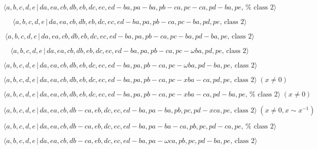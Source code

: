 \documentclass[10pt]{article}
\begin{document}
\begin{equation}
\langle
a,b,c,d,e\,|\,da,ea,cb,db,eb,dc,ec,ed-ba,pa-ba,pb-ca,pc-ca,pd-ba,pe,\,\text{%
class }2\rangle  \tag{7.4696}
\end{equation}

\begin{equation}
\langle a,b,c,d,e\,|\,da,ea,cb,db,eb,dc,ec,ed-ba,pa,pb-ca,pc-ba,pd,pe,\,%
\text{class }2\rangle  \tag{7.4697}
\end{equation}

\begin{equation}
\langle a,b,c,d,e\,|\,da,ea,cb,db,eb,dc,ec,ed-ba,pa,pb-ca,pc-ba,pd-ba,pe,\,%
\text{class }2\rangle  \tag{7.4698}
\end{equation}

\begin{equation}
\langle a,b,c,d,e\,|\,da,ea,cb,db,eb,dc,ec,ed-ba,pa,pb-ca,pc-\omega
ba,pd,pe,\,\text{class }2\rangle  \tag{7.4699}
\end{equation}

\begin{equation}
\langle a,b,c,d,e\,|\,da,ea,cb,db,eb,dc,ec,ed-ba,pa,pb-ca,pc-\omega
ba,pd-ba,pe,\,\text{class }2\rangle  \tag{7.4700}
\end{equation}

\begin{equation}
\langle a,b,c,d,e\,|\,da,ea,cb,db,eb,dc,ec,ed-ba,pa,pb-ca,pc-xba-ca,pd,pe,\,%
\text{class }2\rangle \;(x \neq 0)  \tag{7.4701}
\end{equation}

\begin{equation}
\langle
a,b,c,d,e\,|\,da,ea,cb,db,eb,dc,ec,ed-ba,pa,pb-ca,pc-xba-ca,pd-ba,pe,\,\text{%
class }2\rangle \;(x \neq 0)  \tag{7.4702}
\end{equation}

\begin{equation}
\langle a,b,c,d,e\,|\,da,ea,cb,db-ca,eb,dc,ec,ed-ba,pa-ba,pb,pc,pd-xca,pe,\,%
\text{class }2\rangle \;(x \neq 0, x \sim x^{-1})  \tag{7.4703}
\end{equation}

\begin{equation}
\langle
a,b,c,d,e\,|\,da,ea,cb,db-ca,eb,dc,ec,ed-ba,pa-ba-ca,pb,pc,pd-ca,pe,\,\text{%
class }2\rangle  \tag{7.4704}
\end{equation}

\begin{equation}
\langle a,b,c,d,e\,|\,da,ea,cb,db-ca,eb,dc,ec,ed-ba,pa-\omega
ca,pb,pc,pd-ba,pe,\,\text{class }2\rangle  \tag{7.4705}
\end{equation}
\end{document}
